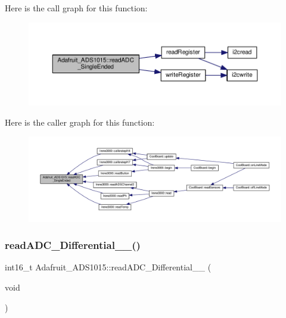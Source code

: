 Here is the call graph for this function\+:\nopagebreak
\begin{figure}[H]
\begin{center}
\leavevmode
\includegraphics[width=350pt]{df/df6/class_adafruit___a_d_s1015_a40f38b9e1f3ec397c0670dd632510235_cgraph}
\end{center}
\end{figure}
Here is the caller graph for this function\+:
\nopagebreak
\begin{figure}[H]
\begin{center}
\leavevmode
\includegraphics[width=350pt]{df/df6/class_adafruit___a_d_s1015_a40f38b9e1f3ec397c0670dd632510235_icgraph}
\end{center}
\end{figure}
\mbox{\label{class_adafruit___a_d_s1015_a56582333958e66efaccd3d4a8a47e3ff}} 
\subsubsection{\texorpdfstring{read\+A\+D\+C\+\_\+\+Differential\+\_\+\_()}{readADC\_Differential\_0\_1()}}
{\footnotesize\ttfamily int16\+\_\+t Adafruit\+\_\+\+A\+D\+S1015\+::read\+A\+D\+C\+\_\+\+Differential\+\_\+\_ (\begin{DoxyParamCaption}\item[{void}]{ }\end{DoxyParamCaption})}



